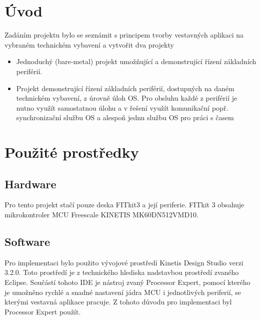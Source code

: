 \documentclass[11pt,a4paper]{article}
\begin{document}
\setlength{\parskip}{0pt}
\hypersetup{hidelinks}\tableofcontents
\setlength{\parskip}{0pt}

\newpage %

\section{Úvod}

    Zadáním projektu bylo se seznámit s principem tvorby vestavných aplikaci na vybraném technickém vybavení
a vytvořit dva projekty
    \begin{itemize}
        \item Jednoduchý (bare-metal) projekt umožňující a demonstrující řízení základních periférií.
        \item Projekt demonstrující řízení základních periférií, dostupných na daném technickém vybavení, z úrovně úloh OS. Pro obsluhu každé z periférií je nutno využít samostatnou úlohu a v řešení využít komunikační popř. synchronizační službu OS a alespoň jednu službu OS pro práci s časem
    \end{itemize} 


\section{Použité prostředky}
    
    \subsection{Hardware}

        \indent Pro tento projekt stačí pouze deska FITkit3 a její periferie. FITkit 3 obsahuje                      mikrokontroler MCU Freescale KINETIS MK60DN512VMD10.

    \subsection{Software}

        \indent Pro implementaci bylo použito vývojové prostředí Kinetis Design Studio verzi 3.2.0.
                Toto prostředí je z technického hlediska nadstavbou prostředí zvaného Eclipse. Součástí tohoto IDE je nástroj zvaný Processor Expert, pomocí kterého je umožněno rychlé a snadné nastavení jádra MCU i jednotlivých periferií, se kterými vestavná aplikace pracuje. Z tohoto důvodu pro implementaci byl Processor Expert použít.
\end{document}
